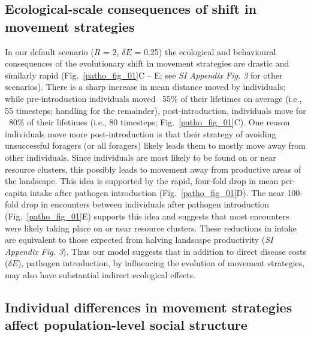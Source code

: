 \subsection*{Ecological-scale consequences of shift in movement strategies}

In our default scenario ($R$ = 2, $\delta E$ = 0.25) the ecological and behavioural consequences of the evolutionary shift in movement strategies are drastic and similarly rapid (Fig.~\ref{patho_fig_01}C -- E; see \textit{SI Appendix Fig. 3} for other scenarios).
There is a sharp increase in mean distance moved by individuals; while pre-introduction individuals moved ~55\% of their lifetimes on average (i.e., 55 timesteps; handling for the remainder), post-introduction, individuals move for ~80\% of their lifetimes (i.e., 80 timesteps; Fig.~\ref{patho_fig_01}C).
One reason individuals move more post-introduction is that their strategy of avoiding unsuccessful foragers (or all foragers) likely leads them to mostly move away from other individuals.
Since individuals are most likely to be found on or near resource clusters, this possibly leads to movement away from productive areas of the landscape.
This idea is supported by the rapid, four-fold drop in mean per-capita intake after pathogen introduction (Fig.~\ref{patho_fig_01}D).
The near 100-fold drop in encounters between individuals after pathogen introduction (Fig.~\ref{patho_fig_01}E) supports this idea and suggests that most encounters were likely taking place on or near resource clusters.
These reductions in intake are equivalent to those expected from halving landscape productivity (\textit{SI Appendix Fig. 3}).
Thus our model suggests that in addition to direct disease costs ($\delta E$), pathogen introduction, by influencing the evolution of movement strategies, may also have substantial indirect ecological effects.

\subsection*{Individual differences in movement strategies affect population-level social structure}

